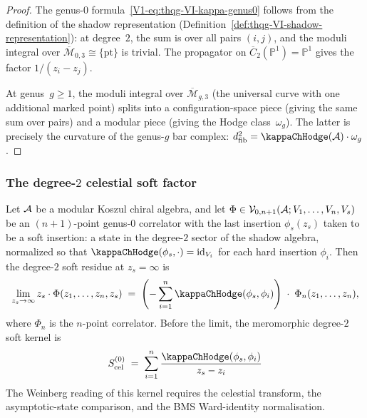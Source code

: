 \begin{proof}
The genus-$0$ formula~\eqref{V1-eq:thqg-VI-kappa-genus0} follows
from the definition of the shadow representation
(Definition~\ref{def:thqg-VI-shadow-representation}): at degree~$2$,
the sum is over all pairs $(i,j)$, and the moduli integral over
$\overline{\mathcal{M}}_{0,3} \cong \{\mathrm{pt}\}$ is trivial.
The propagator on $\overline{C}_2(\mathbb{P}^1) = \mathbb{P}^1$
gives the factor $1/(z_i - z_j)$.

At genus~$g \geq 1$, the moduli integral over
$\overline{\mathcal{M}}_{g,3}$ (the universal curve with one
additional marked point) splits into a configuration-space piece
(giving the same sum over pairs) and a modular piece
(giving the Hodge class~$\omega_g$). The latter is precisely
the curvature of the genus-$g$ bar complex:
$\dfib^2 = \kappaChHodge(\cA) \cdot \omega_g$.
\end{proof}

\subsubsection{The degree-$2$ celestial soft factor}

\begin{theorem}
\label{thm:thqg-VI-leading-soft}
Let $\mathcal{A}$ be a modular Koszul chiral algebra, and let
$\Phi \in \mathcal{V}_{0,n+1}(\mathcal{A}; V_1, \dotsc, V_n, V_s)$ be an
$(n+1)$-point genus-$0$ correlator with the last insertion
$\phi_s(z_s)$ taken to be a soft insertion: a state in the
degree-$2$ sector of the shadow algebra, normalized so that
$\kappaChHodge(\phi_s, \cdot) = \id_{V_i}$ for each hard insertion
$\phi_i$. Then the degree-$2$ soft residue at $z_s=\infty$ is
\begin{equation}%
\lim_{z_s \to \infty}
z_s \cdot \Phi(z_1, \dotsc, z_n, z_s)
\;=\;
\left(-\sum_{i=1}^{n}\kappaChHodge(\phi_s,\phi_i)\right)
\;\cdot\;
\Phi_n(z_1, \dotsc, z_n),
\end{equation}
where $\Phi_n$ is the $n$-point correlator. Before the limit, the
meromorphic degree-$2$ soft kernel is
\begin{equation}%
S^{(0)}_{\mathrm{cel}}
\;=\;
\sum_{i=1}^{n}
\frac{\kappaChHodge(\phi_s, \phi_i)}{z_s - z_i}
\end{equation}
The Weinberg reading of this kernel requires the celestial transform,
the asymptotic-state comparison, and the BMS Ward-identity
normalisation.
\end{theorem}

